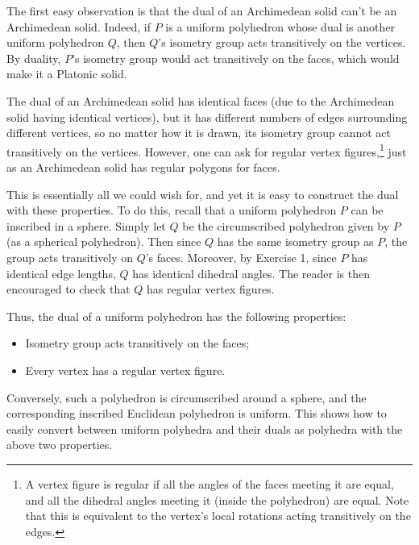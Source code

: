 \documentclass[leqno]{book}
\begin{document}
The first easy observation is that the dual of an Archimedean solid can't be an Archimedean solid.  Indeed, if $P$ is a uniform polyhedron whose dual is another uniform polyhedron $Q$, then $Q$'s isometry group acts transitively on the vertices.  By duality, $P$'s isometry group would act transitively on the faces, which would make it a Platonic solid.

The dual of an Archimedean solid has identical faces (due to the Archimedean solid having identical vertices), but it has different numbers of edges surrounding different vertices, so no matter how it is drawn, its isometry group cannot act transitively on the vertices.  However, one can ask for regular vertex figures,\footnote{A vertex figure is regular if all the angles of the faces meeting it are equal, and all the dihedral angles meeting it (inside the polyhedron) are equal.  Note that this is equivalent to the vertex's local rotations acting transitively on the edges.} just as an Archimedean solid has regular polygons for faces.

This is essentially all we could wish for, and yet it is easy to construct the dual with these properties.  To do this, recall that a uniform polyhedron $P$ can be inscribed in a sphere.  Simply let $Q$ be the circumscribed polyhedron given by $P$ (as a spherical polyhedron).  Then since $Q$ has the same isometry group as $P$, the group acts transitively on $Q$'s faces.  Moreover, by Exercise 1, since $P$ has identical edge lengths, $Q$ has identical dihedral angles.  The reader is then encouraged to check that $Q$ has regular vertex figures.

Thus, the dual of a uniform polyhedron has the following properties:
\begin{itemize}
\item Isometry group acts transitively on the faces;

\item Every vertex has a regular vertex figure.
\end{itemize}
Conversely, such a polyhedron is circumscribed around a sphere, and the corresponding inscribed Euclidean polyhedron is uniform.  This shows how to easily convert between uniform polyhedra and their duals as polyhedra with the above two properties.
\end{document}
